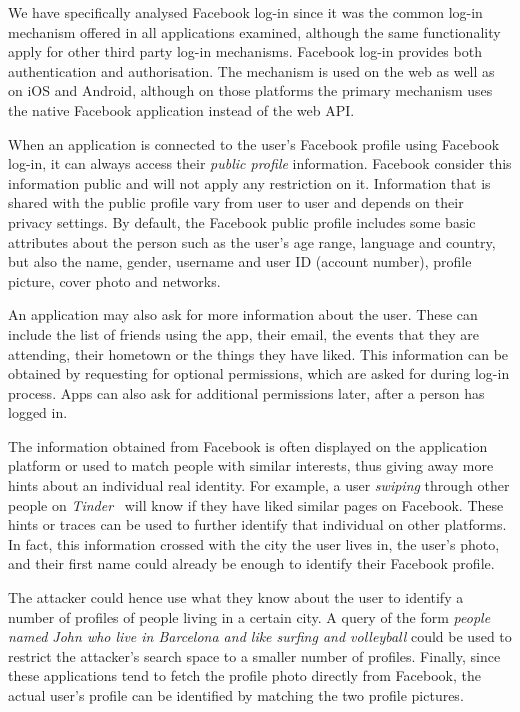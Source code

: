 We have specifically analysed Facebook log-in since it was the common log-in mechanism offered in all applications examined, although the same functionality apply for other third party log-in mechanisms. Facebook log-in provides both authentication and authorisation. The mechanism is used on the web as well as on iOS and Android, although on those platforms the primary mechanism uses the native Facebook application instead of the web API.

When an application is connected to the user's Facebook profile using Facebook log-in, it can always access their \emph{public profile} information. Facebook consider this information public and will not apply any restriction on it. Information that is shared with the public profile vary from user to user and depends on their privacy settings. By default, the Facebook public profile includes some basic attributes about the person such as the user's age range, language and country, but also the name, gender, username and user ID (account number), profile picture, cover photo and networks.

An application may also ask for more information about the user. These can include the list of friends using the app, their email, the events that they are attending, their hometown or the things they have liked. This information can be obtained by requesting for optional permissions, which are asked for during log-in process. Apps can also ask for additional permissions later, after a person has logged in.

The information obtained from Facebook is often displayed on the application platform or used to match people with similar interests, thus giving away more hints about an individual real identity. For example, a user \emph{swiping} through other people on \emph{Tinder}~\cite{tinder} will know if they have liked similar pages on Facebook.
These hints or traces can be used to further identify that individual on other platforms. In fact, this information crossed with the city the user lives in, the user's photo, and their first name could already be enough to identify their Facebook profile.

The attacker could hence use what they know about the user to identify a number of profiles of people living in a certain city. A query of the form \emph{people named John who live in Barcelona and like surfing and volleyball} could be used to restrict the attacker's search space to a smaller number of profiles. Finally, since these applications tend to fetch the profile photo directly from Facebook, the actual user's profile can be identified by matching the two profile pictures.

